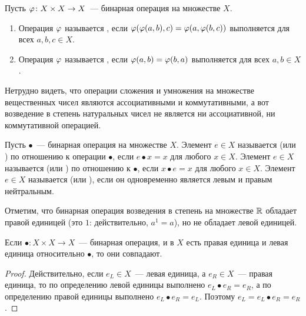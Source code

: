 \begin{definition}
Пусть $\varphi\colon X\times X\to X$~--- бинарная операция на множестве $X$.
\begin{enumerate}
\item Операция $\varphi$ называется
, если
$\varphi(\varphi(a,b),c)=\varphi(a,\varphi(b,c))$ выполняется для всех
$a,b,c\in X$.
\item Операция $\varphi$ называется
  ,
  если
  $\varphi(a,b)=\varphi(b,a)$ выполняется для всех $a,b\in X$.
\end{enumerate} 
\end{definition}
Нетрудно видеть, что операции сложения и умножения на множестве
вещественных чисел являются ассоциативными и коммутативными, а вот
возведение в степень
натуральных чисел не является ни
ассоциативной, ни коммутативной операцией.

\begin{definition}
Пусть $\bullet$~--- бинарная операция на множестве $X$. 
Элемент $e\in X$ называется
(или ) по отношению к операции
$\bullet$, если $e\bullet x = x$ для любого $x\in X$. Элемент $e\in X$
называется
 (или
) по
отношению к $\bullet$, если
$x\bullet e = x$ для любого $x\in X$. Элемент $e\in X$ называется
 (или
), если он одновременно является
левым и правым нейтральным.
\end{definition}

Отметим, что бинарная операция возведения в степень на множестве
$\mathbb R$ обладает правой единицей (это $1$: действительно, $a^1 = a$),
но не обладает левой единицей.

\begin{lemma}
Если $\bullet\colon X\times X\to X$~--- бинарная операция,
и в $X$ есть правая единица и левая единица относительно
$\bullet$, то они совпадают.
\end{lemma}
\begin{proof}
Действительно, если $e_L\in X$~--- левая единица, а $e_R\in X$~---
правая единица, то по определению левой единицы выполнено $e_L\bullet
e_R = e_R$, а по определению правой единицы выполнено $e_L\bullet e_R
= e_L$. Поэтому
$e_L = e_L\bullet e_R = e_R$.
\end{proof}

